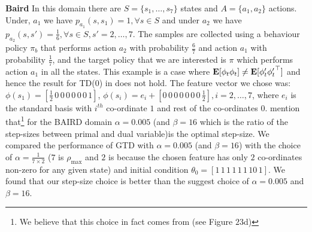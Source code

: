 \begin{comment} 
\begin{table}
\caption{step-size choices for the \emph{on/off}-policy settings in the mountain car experiment. The same step-size rule was followed for TD as well as GTD. Notice that these step-size choices directly follow from the results in \Cref{th:tdadmis} without any further tuning.}
\label{tab:step-size}
\resizebox{\columnwidth}{!}{
\begin{tabular}{|c|c|c|c|}\hline
\backslashbox{Policy}{Basis} & Tile& \makecell{Fourier\\ Un-normalized} &\makecell{Fourier \\ Normalized}\\ \hline
	TD(0)\emph{on}& $\frac1k$	&$\frac1d$ & $1$\\ \hline
	TD(0)\emph{off}& $\frac1{\rho_{\max}k}$	& $\frac1{\rho_{\max}d}$ & $\frac1{\rho_{\max}}$\\\hline			
	GTD\emph{on}& $\frac1{2k^2}$	&$\frac1{2d^2}$ & $\frac{1}{2}$\\ \hline
	GTD\emph{off}& $\frac1{2\rho_{\max}k^2}$	& $\frac1{2\rho_{\max}d^2}$ & $\frac1{2\rho_{\max}}$\\\hline			

\end{tabular}
}
\end{table}
%
\end{comment}
\textbf{Baird} In this domain there are $S=\{s_1,\ldots,s_7\}$ states and $A=\{a_1,a_2\}$ actions. Under, $a_1$ we have $p_{a_1}(s,s_1)=1, \forall s\in S$ and under $a_2$ we have $p_{a_2}(s,s')=\frac{1}{6}, \forall s\in S, s'=2,\ldots,7$. The samples are collected using a behaviour policy $\pi_b$ that performs action $a_2$ with probability $\frac{6}{7}$ and action $a_1$ with probability $\frac17$, and the target policy that we are interested is $\pi$ which performs action $a_1$ in all the states. This example is a case where $\mathbf{E}[{\phi_t\phi_t}]\neq\mathbf{E}[{\phi'_t{\phi'_t}^\top}]$ and hence the result for TD(0) in  does not hold. The feature vector we chose was: $\phi(s_1)=[\frac{1}{2}\,0\,0\,0\,0\,0\,0\,1]$, $\phi(s_i)=e_i+[0\,0\,0\,0\,0\,0\,0\,\frac{1}{2}], i=2,\ldots,7$, where $e_i$ is the standard basis with $i^{th}$ co-ordinate $1$ and rest of the co-ordinates $0$.
\citet{gtdmp} mention that\footnote{We believe that this choice in fact comes from \cite{dann} (see Figure $23$d) } for the BAIRD domain $\alpha=0.005$ (and $\beta=16$ which is the ratio of the step-sizes between primal and dual variable)is the optimal step-size. We compared the performance of GTD with $\alpha=0.005$ (and $\beta=16$) with the choice of $\alpha=\frac{1}{7\times 2}$ ($7$ is $\rho_{\max}$ and $2$ is because the chosen feature has only $2$ co-ordinates non-zero for any given state) and initial condition $\theta_0=[1\, 1\, 1\, 1\, 1\, 1\, 10\, 1]$. We found that our step-size choice is better than the suggest choice of $\alpha=0.005$ and $\beta=16$.

